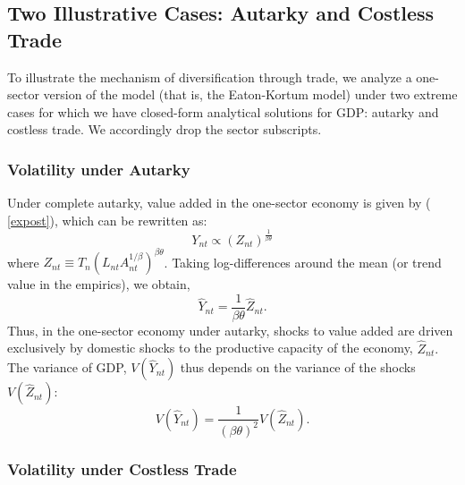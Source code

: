 \documentclass[12pt]{article}
\begin{document}
\subsection{Two Illustrative Cases: Autarky and Costless Trade}

To illustrate the mechanism of diversification through trade, we analyze a
one-sector version of the model (that is, the Eaton-Kortum model) under two
extreme cases for which we have closed-form analytical solutions for GDP:
autarky and costless trade. We accordingly drop the sector subscripts.

\subsubsection{Volatility under Autarky}

Under complete autarky, value added in the one-sector economy is given by (%
\ref{expost}), which can be rewritten as: 
\begin{equation*}
Y_{nt}\propto \left( Z_{nt}\right) ^{\frac{1}{\beta \theta }}
\end{equation*}
where $Z_{nt}\equiv T_{n}\left( L_{nt}A_{nt}^{1/\beta }\right)^{\beta\theta
} $. Taking log-differences around the mean (or trend value in the
empirics), we obtain, 
\begin{equation*}
\hat{Y}_{nt}=\frac{1}{\beta \theta }\hat{Z}_{nt}.
\end{equation*}
Thus, in the one-sector economy under autarky, shocks to value added are
driven exclusively by domestic shocks to the productive capacity of the
economy, $\hat{Z}_{nt}.$ The variance of GDP, $V(\hat{Y}_{nt})$ thus depends
on the variance of the shocks $V(\hat{Z}_{nt})$: 
\begin{equation*}
V(\hat{Y}_{nt})=\frac{1}{\left( \beta \theta \right) ^{2}}V(\hat{Z}_{nt}).
\end{equation*}

\subsubsection{Volatility under Costless Trade}
\end{document}
